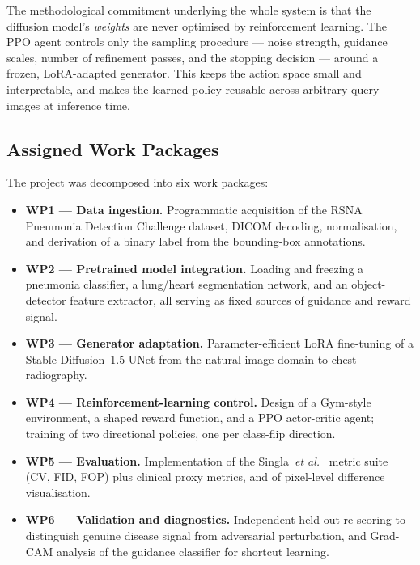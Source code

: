 The methodological commitment underlying the whole system is that the
diffusion model's \emph{weights} are never optimised by reinforcement
learning. The PPO agent controls only the sampling procedure --- noise
strength, guidance scales, number of refinement passes, and the stopping
decision --- around a frozen, LoRA-adapted generator. This keeps the
action space small and interpretable, and makes the learned policy
reusable across arbitrary query images at inference time.

\subsection{Assigned Work Packages}

The project was decomposed into six work packages:

\begin{itemize}[leftmargin=*]
  \item \textbf{WP1 --- Data ingestion.} Programmatic acquisition of the
        RSNA Pneumonia Detection Challenge dataset, DICOM decoding,
        normalisation, and derivation of a binary label from the
        bounding-box annotations.
  \item \textbf{WP2 --- Pretrained model integration.} Loading and
        freezing a pneumonia classifier, a lung/heart segmentation
        network, and an object-detector feature extractor, all serving as
        fixed sources of guidance and reward signal.
  \item \textbf{WP3 --- Generator adaptation.} Parameter-efficient
        LoRA fine-tuning of a Stable Diffusion~1.5 UNet from the
        natural-image domain to chest radiography.
  \item \textbf{WP4 --- Reinforcement-learning control.} Design of a
        Gym-style environment, a shaped reward function, and a PPO
        actor-critic agent; training of two directional policies, one per
        class-flip direction.
  \item \textbf{WP5 --- Evaluation.} Implementation of the
        Singla~\emph{et al.}~\cite{singla2022} metric suite (CV, FID,
        FOP) plus clinical proxy metrics, and of pixel-level difference
        visualisation.
  \item \textbf{WP6 --- Validation and diagnostics.} Independent
        held-out re-scoring to distinguish genuine disease signal from
        adversarial perturbation, and Grad-CAM analysis of the guidance
        classifier for shortcut learning.
\end{itemize}


